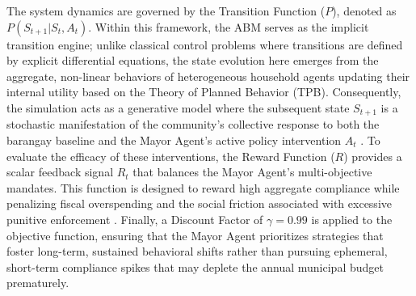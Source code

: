 The system dynamics are governed by the Transition Function ($P$), denoted as $P(S_{t+1} | S_t, A_t)$. Within this framework, the ABM serves as the implicit transition engine; unlike classical control problems where transitions are defined by explicit differential equations, the state evolution here emerges from the aggregate, non-linear behaviors of heterogeneous household agents updating their internal utility based on the Theory of Planned Behavior (TPB). Consequently, the simulation acts as a generative model where the subsequent state $S_{t+1}$ is a stochastic manifestation of the community’s collective response to both the barangay baseline and the Mayor Agent's active policy intervention $A_t$ \citep{TianReview2024, Jimenez2025}. To evaluate the efficacy of these interventions, the Reward Function ($R$) provides a scalar feedback signal $R_t$ that balances the Mayor Agent’s multi-objective mandates. This function is designed to reward high aggregate compliance while penalizing fiscal overspending and the social friction associated with excessive punitive enforcement \citep{Jimenez2025}. Finally, a Discount Factor of $\gamma = 0.99$ is applied to the objective function, ensuring that the Mayor Agent prioritizes strategies that foster long-term, sustained behavioral shifts rather than pursuing ephemeral, short-term compliance spikes that may deplete the annual municipal budget prematurely.